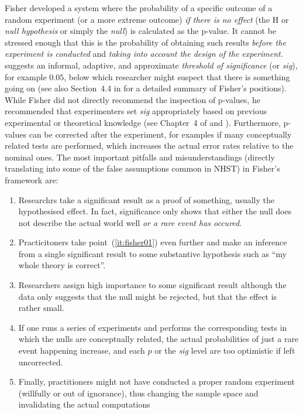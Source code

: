 Fisher developed a system where the probability of a specific outcome of a random experiment (or a more extreme outcome) \textit{if there is no effect} (the H or \textit{null hypothesis} or simply the \textit{null}) is calculated as the p-value.
It cannot be stressed enough that this is the probability of obtaining such results \textit{before the experiment is conducted} and \textit{taking into account the design of the experiment}.
\textcite[504]{Fisher1926} suggests an informal, adaptive, and approximate \textit{threshold of significance} (or \textit{sig}), for example $0.05$, below which researcher might suspect that there is something going on (see also Section~4.4 in \citealt{Lehmann2011} for a detailed summary of Fisher's positions).
While Fisher did not directly recommend the inspection of p-values, he recommended that experimenters set \textit{sig} appropriately based on previous experimental or theoretical knowledge (see Chapter~4 of \citealt{Lehmann2011} and \citealt{Perezgonzalez2015}).
Furthermore, p-values can be corrected after the experiment, for examples if many conceptually related tests are performed, which increases the actual error rates relative to the nominal ones.
The most important pitfalls and misunderstandings (directly translating into some of the false assumptions common in NHST) in Fisher's framework are:

\vspace{\baselineskip}
\begin{enumerate}
  \item \label{it:fisher01} Researchrs take a significant result as a proof of something, usually the hypothesised effect.
    In fact, significance only shows that either the null does not describe the actual world well \textit{or a rare event has occured}.
  \item \label{it:fisher02} Practicitoners take point~(\ref{it:fisher01}) even further and make an inference from a single significant result to some substantive hypothesis such as ``my whole theory is correct''.
  \item \label{it:fisher03} Researchers assign high importance to some significant result although the data only suggests that the null might be rejected, but that the effect is rather small.
  \item \label{it:fisher04} If one runs a series of experiments and performs the corresponding tests in which the nulls are conceptually related, the actual probabilities of just a rare event happening increase, and each $p$ or the \textit{sig} level are too optimistic if left uncorrected.
  \item \label{it:fisher05} Finally, practitioners might not have conducted a proper random experiment (willfully or out of ignorance), thus changing the sample space and invalidating the actual computations
\end{enumerate}
\vspace{\baselineskip}


